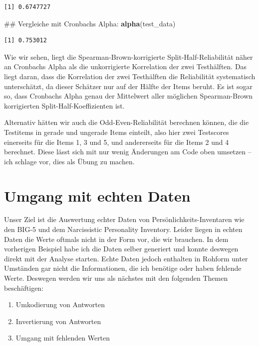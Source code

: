\documentclass[12pt,]{tufte-book}
\newenvironment{Shaded}{\begin{snugshade}}{\end{snugshade}}
\newcommand{\KeywordTok}[1]{\textcolor[rgb]{0.13,0.29,0.53}{\textbf{#1}}}
\newcommand{\NormalTok}[1]{#1}
\providecommand{\tightlist}{%
  \setlength{\itemsep}{0pt}\setlength{\parskip}{0pt}}
\theoremstyle{definition}
\theoremstyle{definition}
\theoremstyle{definition}
\theoremstyle{remark}
\begin{document}
\begin{verbatim}
[1] 0.6747727
\end{verbatim}

\begin{Shaded}
\begin{Highlighting}[]
\NormalTok{## Vergleiche mit Cronbachs Alpha:}
\KeywordTok{alpha}\NormalTok{(test_data)}
\end{Highlighting}
\end{Shaded}

\begin{verbatim}
[1] 0.753012
\end{verbatim}

Wie wir sehen, liegt die Spearman-Brown-korrigierte
Split-Half-Reliabilität näher an Cronbachs Alpha als die unkorrigierte
Korrelation der zwei Testhälften. Das liegt daran, dass die Korrelation
der zwei Testhälften die Reliabilität systematisch unterschätzt, da
dieser Schätzer nur auf der Hälfte der Items beruht. Es ist sogar so,
dass Cronbachs Alpha genau der Mittelwert aller möglichen Spearman-Brown
korrigierten Split-Half-Koeffizienten ist.

Alternativ hätten wir auch die Odd-Even-Reliabilität berechnen können,
die die Testitems in gerade und ungerade Items einteilt, also hier zwei
Testscores einerseits für die Items 1, 3 und 5, und andererseits für die
Items 2 und 4 berechnet. Diese lässt sich mit nur wenig Änderungen am
Code oben umsetzen -- ich schlage vor, dies als Übung zu machen.

\section{Umgang mit echten Daten}\label{umgang-mit-echten-daten}

Unser Ziel ist die Auswertung echter Daten von
Persönlichkeits-Inventaren wie den BIG-5 und dem Narcissistic
Personality Inventory. Leider liegen in echten Daten die Werte oftmals
nicht in der Form vor, die wir brauchen. In dem vorherigen Beispiel habe
ich die Daten selber generiert und konnte deswegen direkt mit der
Analyse starten. Echte Daten jedoch enthalten in Rohform unter Umständen
gar nicht die Informationen, die ich benötige oder haben fehlende Werte.
Deswegen werden wir uns als nächstes mit den folgenden Themen
beschäftigen:

\begin{enumerate}
\def\labelenumi{\arabic{enumi}.}
\tightlist
\item
  Umkodierung von Antworten
\item
  Invertierung von Antworten
\item
  Umgang mit fehlenden Werten
\end{enumerate}
\end{document}
